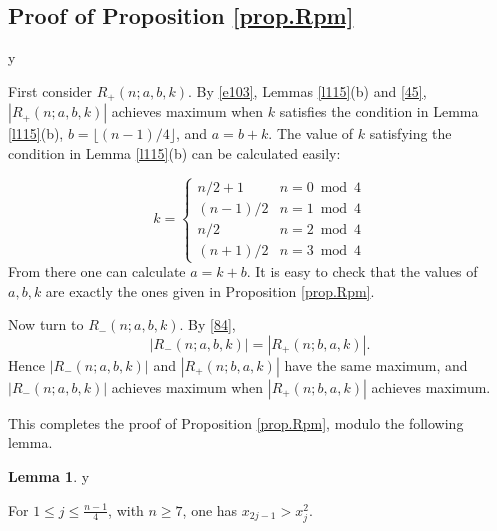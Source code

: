 \documentclass{amsart}
\theoremstyle{definition}
\newtheorem{lemma}[theorem]{Lemma}
\def\printname#1{
    \if\draft y
        \smash{\makebox[0pt]{\hspace{-0.5in}
            \raisebox{8pt}{\tt\tiny #1}}}
    \fi
}
\def\lbl#1{\label{#1}\printname{#1}}
\begin{document}
\subsection{Proof of  Proposition \ref{prop.Rpm}}
\lbl{sub.pf71}
First consider $R_+(n;a,b,k)$. By \eqref{e103}, Lemmas \ref{l115}(b) and \ref{45}, $|R_+(n;a,b,k)|$ achieves maximum when $k$ satisfies the condition  in Lemma \ref{l115}(b),
$b = \lfloor (n-1)/4 \rfloor$, and $a= b+k$. The value of $k$ satisfying the condition in Lemma \ref{l115}(b) can be calculated easily:

$$
k= \begin{cases}
n/2 + 1  &   n=0 \bmod 4 \\
(n-1)/2  &  n=1 \bmod 4 \\
n/2      &  n=2 \bmod 4 \\
(n+1)/2  &  n=3 \bmod 4
\end{cases}
$$
From there one can calculate $a= k+b$. It is easy to check that the values of $a,b,k$ are exactly the ones given in Proposition \ref{prop.Rpm}. 

Now turn to 
 $R_-(n;a,b,k)$. By \eqref{84}, 
 $$ |R_-(n;a,b,k)| = |R_+(n;b,a,k)|.$$
Hence $|R_-(n;a,b,k)|$  and $|R_+(n;b,a,k)|$ have the same maximum, and $|R_-(n;a,b,k)|$ achieves maximum when $|R_+(n;b,a,k)|$ achieves maximum.

This completes the proof of
Proposition \ref{prop.Rpm}, modulo the following lemma.



\begin{lemma}
\lbl{leml101}
For $1 \le j \le \frac {n-1}4$, with $n \ge 7$, one has $x_{2j-1} > x_j^2$.
\end{lemma}
\end{document}

